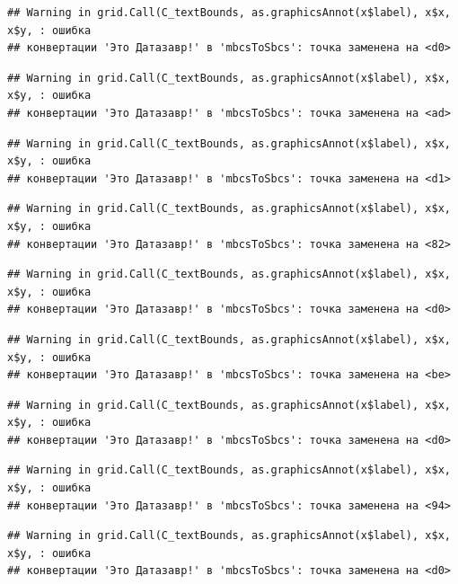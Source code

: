 \documentclass[]{book}
\begin{document}
\begin{verbatim}
## Warning in grid.Call(C_textBounds, as.graphicsAnnot(x$label), x$x, x$y, : ошибка
## конвертации 'Это Датазавр!' в 'mbcsToSbcs': точка заменена на <d0>
\end{verbatim}

\begin{verbatim}
## Warning in grid.Call(C_textBounds, as.graphicsAnnot(x$label), x$x, x$y, : ошибка
## конвертации 'Это Датазавр!' в 'mbcsToSbcs': точка заменена на <ad>
\end{verbatim}

\begin{verbatim}
## Warning in grid.Call(C_textBounds, as.graphicsAnnot(x$label), x$x, x$y, : ошибка
## конвертации 'Это Датазавр!' в 'mbcsToSbcs': точка заменена на <d1>
\end{verbatim}

\begin{verbatim}
## Warning in grid.Call(C_textBounds, as.graphicsAnnot(x$label), x$x, x$y, : ошибка
## конвертации 'Это Датазавр!' в 'mbcsToSbcs': точка заменена на <82>
\end{verbatim}

\begin{verbatim}
## Warning in grid.Call(C_textBounds, as.graphicsAnnot(x$label), x$x, x$y, : ошибка
## конвертации 'Это Датазавр!' в 'mbcsToSbcs': точка заменена на <d0>
\end{verbatim}

\begin{verbatim}
## Warning in grid.Call(C_textBounds, as.graphicsAnnot(x$label), x$x, x$y, : ошибка
## конвертации 'Это Датазавр!' в 'mbcsToSbcs': точка заменена на <be>
\end{verbatim}

\begin{verbatim}
## Warning in grid.Call(C_textBounds, as.graphicsAnnot(x$label), x$x, x$y, : ошибка
## конвертации 'Это Датазавр!' в 'mbcsToSbcs': точка заменена на <d0>
\end{verbatim}

\begin{verbatim}
## Warning in grid.Call(C_textBounds, as.graphicsAnnot(x$label), x$x, x$y, : ошибка
## конвертации 'Это Датазавр!' в 'mbcsToSbcs': точка заменена на <94>
\end{verbatim}

\begin{verbatim}
## Warning in grid.Call(C_textBounds, as.graphicsAnnot(x$label), x$x, x$y, : ошибка
## конвертации 'Это Датазавр!' в 'mbcsToSbcs': точка заменена на <d0>
\end{verbatim}
\end{document}
